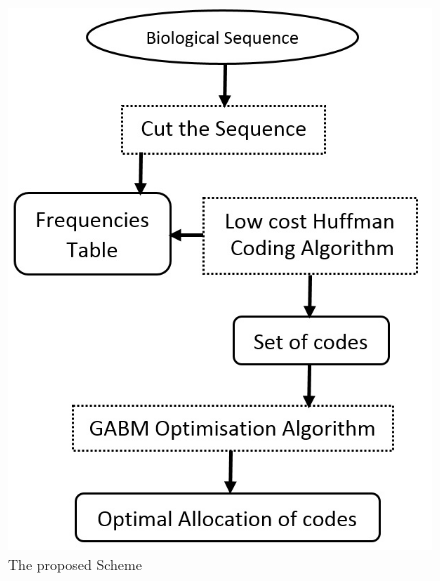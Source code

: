 \documentclass[preprint,12pt]{elsarticle}
\begin{document}
\begin{figure}[thpb]
\begin{center}

\includegraphics[scale=0.5]{Images/Drawing3.jpg}
\caption{The proposed Scheme}
\end{center}
\label{Fig1}
\end{figure}
\end{document}
